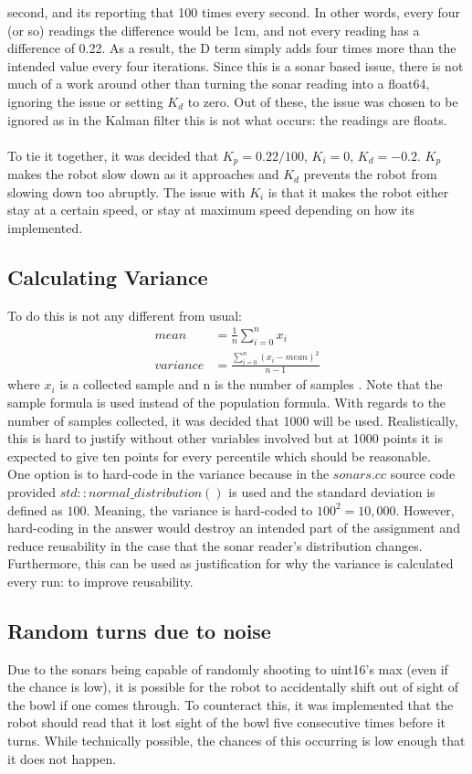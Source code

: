 \documentclass{article}
\newcommand\tab[1][1cm]{\hspace*{#1}}
\begin{document}
second, and its reporting that 100 times every second. In other words, every
four (or so) readings the difference would be 1cm, and not every reading has a
difference of 0.22. As a result, the D term simply adds four times more than the
intended value every four iterations. Since this is a sonar based issue, there
is not much of a work around other than turning the sonar reading into a
float64, ignoring the issue or setting $K_d$ to zero. Out of these, the issue was
chosen to be ignored as in the Kalman filter this is not what occurs: the
readings are floats.
\\ \\
To tie it together, it was decided that $K_p=0.22/100$, $K_i=0$, $K_d=-0.2$.
$K_p$ makes the robot slow down as it approaches and $K_d$ prevents the robot
from slowing down too abruptly. The issue with $K_i$ is that it makes the robot
either stay at a certain speed, or stay at maximum speed depending on how its
implemented.  
\subsection{Calculating Variance}
To do this is not any different from usual:
\begin{equation}
    \begin{split}
        mean & = \frac{1}{n} \sum_{i=0}^n{x_i} \\
        variance & = \frac{\sum_{i=0}^n{(x_i - mean)^2}}{n-1}
    \end{split}
\end{equation}
where $x_i$ is a collected sample and n is the number of samples
\cite{variance}. Note that the sample formula is used instead of the population
formula. With regards to the number of samples collected, it was decided that
1000 will be used. Realistically, this is hard to justify without other
variables involved but at 1000 points it is expected to give ten points for
every percentile which should be reasonable.  
\\ \tab One option is to hard-code in the variance because in the $sonars.cc$ 
source code provided $std::normal\_distribution()$ is used and the standard
deviation is defined as $100$. Meaning, the variance is hard-coded to $100^2 =
10,000$. However, hard-coding in the answer would destroy an intended part of
the assignment and reduce reusability in the case that the sonar reader's
distribution changes. Furthermore, this can be used as justification for why the
variance is calculated every run: to improve reusability.
\subsection{Random turns due to noise}
Due to the sonars being capable of randomly shooting to uint16's max (even if
the chance is low), it is possible for the robot to accidentally shift out of
sight of the bowl if one comes through. To counteract this, it was implemented
that the robot should read that it lost sight of the bowl five consecutive times
before it turns. While technically possible, the chances of this occurring is low
enough that it does not happen. 
\newpage
\end{document}
